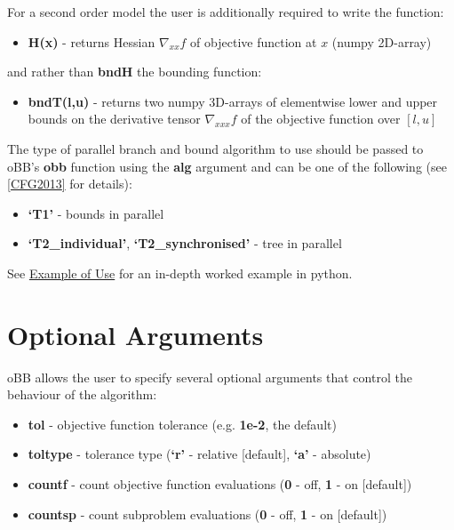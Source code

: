 \documentclass[letterpaper,11pt,openany,oneside]{sphinxmanual}
\begin{document}
For a second order model the user is additionally required to write the function:
\begin{itemize}
\item {} 
\textbf{H(x)} - returns Hessian \(\nabla_{xx} f\) of objective function at \(x\) (numpy 2D-array)

\end{itemize}

and rather than \textbf{bndH} the bounding function:
\begin{itemize}
\item {} 
\textbf{bndT(l,u)} - returns two numpy 3D-arrays of elementwise lower and upper bounds on the derivative tensor \(\nabla_{xxx} f\) of the objective function over \([l,u]\)

\end{itemize}

The type of parallel branch and bound algorithm to use should be passed to oBB's \textbf{obb} function using the \textbf{alg} argument and can be one of the following (see {\hyperref[userguide:cfg2013]{{[}CFG2013{]}}} for details):
\begin{itemize}
\item {} 
\textbf{`T1'} - bounds in parallel

\item {} 
\textbf{`T2\_individual'}, \textbf{`T2\_synchronised'} - tree in parallel

\end{itemize}

See {\hyperref[userguide:example-of-use]{Example of Use}} for an in-depth worked example in python.


\section{Optional Arguments}
\label{userguide:optional-arguments}
oBB allows the user to specify several optional arguments that control the behaviour of the algorithm:
\begin{itemize}
\item {} 
\textbf{tol} - objective function tolerance (e.g. \textbf{1e-2}, the default)

\item {} 
\textbf{toltype} - tolerance type (\textbf{`r'} - relative {[}default{]}, \textbf{`a'} - absolute)

\item {} 
\textbf{countf} - count objective function evaluations (\textbf{0} - off, \textbf{1} - on {[}default{]})

\item {} 
\textbf{countsp} - count subproblem evaluations (\textbf{0} - off, \textbf{1} - on {[}default{]})

\end{itemize}
\end{document}
